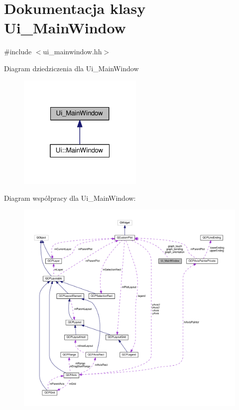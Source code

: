 \hypertarget{class_ui___main_window}{}\section{Dokumentacja klasy Ui\+\_\+\+Main\+Window}
\label{class_ui___main_window}


{\ttfamily \#include $<$ui\+\_\+mainwindow.\+hh$>$}



Diagram dziedziczenia dla Ui\+\_\+\+Main\+Window\nopagebreak
\begin{figure}[H]
\begin{center}
\leavevmode
\includegraphics[width=169pt]{class_ui___main_window__inherit__graph}
\end{center}
\end{figure}


Diagram współpracy dla Ui\+\_\+\+Main\+Window\+:\nopagebreak
\begin{figure}[H]
\begin{center}
\leavevmode
\includegraphics[width=350pt]{class_ui___main_window__coll__graph}
\end{center}
\end{figure}
